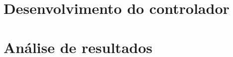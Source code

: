 \section{Desenvolvimento do controlador}
\label{sec:desenvolvimento_do_controlador}


\section{Análise de resultados}
\label{sec:analise_de_resultados}

